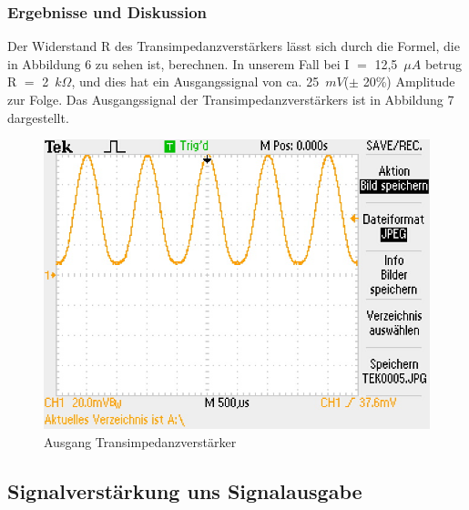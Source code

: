 \subsubsection{Ergebnisse und Diskussion}
Der Widerstand R des Transimpedanzverst\"arkers l\"asst sich durch die Formel, die in Abbildung 6 zu sehen ist, berechnen. In unserem Fall bei I $=$ 12,5~$\mu A$ betrug R $=$ 2~$k\Omega$, und dies hat ein Ausgangssignal von ca. 25~$mV$($\pm$ 20\%) Amplitude zur Folge. Das Ausgangssignal der Transimpedanzverst\"arkers ist in Abbildung 7 dargestellt.
\begin{figure}[!h]
\begin{center}
\includegraphics[scale=0.4]{bild/transimpedanzsignal}
\caption{Ausgang Transimpedanzverst\"arker}
\end{center}
\end{figure}
\subsection{Signalverst\"arkung uns Signalausgabe}
